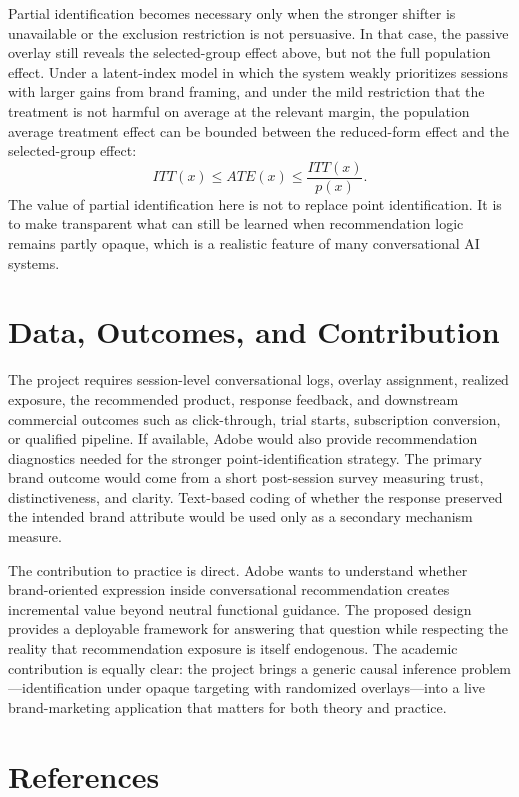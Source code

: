 \documentclass[11pt]{article}
\begin{document}
Partial identification becomes necessary only when the stronger shifter is unavailable or the exclusion restriction is not persuasive. In that case, the passive overlay still reveals the selected-group effect above, but not the full population effect. Under a latent-index model in which the system weakly prioritizes sessions with larger gains from brand framing, and under the mild restriction that the treatment is not harmful on average at the relevant margin, the population average treatment effect can be bounded between the reduced-form effect and the selected-group effect:
\[
ITT(x) \le ATE(x) \le \frac{ITT(x)}{p(x)}.
\]
The value of partial identification here is not to replace point identification. It is to make transparent what can still be learned when recommendation logic remains partly opaque, which is a realistic feature of many conversational AI systems.

\section{Data, Outcomes, and Contribution}

The project requires session-level conversational logs, overlay assignment, realized exposure, the recommended product, response feedback, and downstream commercial outcomes such as click-through, trial starts, subscription conversion, or qualified pipeline. If available, Adobe would also provide recommendation diagnostics needed for the stronger point-identification strategy. The primary brand outcome would come from a short post-session survey measuring trust, distinctiveness, and clarity. Text-based coding of whether the response preserved the intended brand attribute would be used only as a secondary mechanism measure.

The contribution to practice is direct. Adobe wants to understand whether brand-oriented expression inside conversational recommendation creates incremental value beyond neutral functional guidance. The proposed design provides a deployable framework for answering that question while respecting the reality that recommendation exposure is itself endogenous. The academic contribution is equally clear: the project brings a generic causal inference problem---identification under opaque targeting with randomized overlays---into a live brand-marketing application that matters for both theory and practice.

\section*{References}
\end{document}
